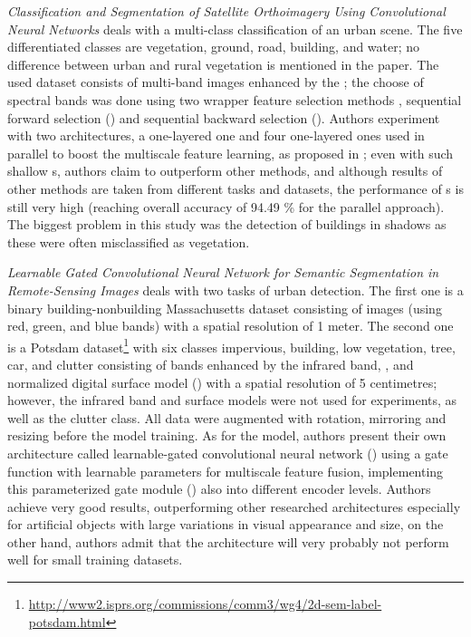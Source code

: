 \textit{Classification and Segmentation of Satellite Orthoimagery Using Convolutional Neural Networks} deals with a multi-class classification of an urban scene. The five differentiated classes are vegetation, ground, road, building, and water; no difference between urban and rural vegetation is mentioned in the paper. The used dataset consists of multi-band images enhanced by the ; the choose of spectral bands was done using two wrapper feature selection methods \cite{wrapper-feature-selection}, sequential forward selection () and sequential backward selection (). Authors experiment with two  architectures, a one-layered one and four one-layered ones used in parallel to boost the multiscale feature learning, as proposed in \cite{multiscale-parallel-cnn}; even with such shallow s, authors claim to outperform other  methods, and although results of other methods are taken from different tasks and datasets, the performance of s is still very high (reaching overall accuracy of 94.49 \% for the parallel approach). The biggest problem in this study was the detection of buildings in shadows as these were often misclassified as vegetation.

\textit{Learnable Gated Convolutional Neural Network for Semantic Segmentation in Remote-Sensing Images} deals with two tasks of urban detection. The first one is a binary building-nonbuilding Massachusetts dataset \cite{massachusetts-dataset} consisting of \cite{RGB} images (using red, green, and blue bands) with a spatial resolution of 1 meter. The second one is a Potsdam dataset\footnote{\url{http://www2.isprs.org/commissions/comm3/wg4/2d-sem-label-potsdam.html}} with six classes impervious, building, low vegetation, tree, car, and clutter consisting of  bands enhanced by the infrared band, , and normalized digital surface model () with a spatial resolution of 5 centimetres; however, the infrared band and surface models were not used for experiments, as well as the clutter class. All data were augmented with rotation, mirroring and resizing before the model training. As for the model, authors present their own architecture called learnable-gated convolutional neural network () using a gate function with learnable parameters for multiscale feature fusion, implementing this parameterized gate module () also into different encoder levels. Authors achieve very good results, outperforming other researched architectures especially for artificial objects with large variations in visual appearance and size, on the other hand, authors admit that the architecture will very probably not perform well for small training datasets.

